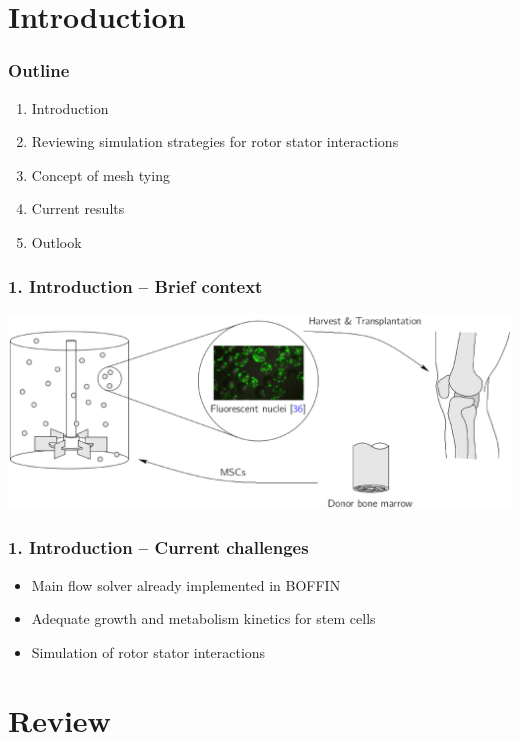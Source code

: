 \documentclass[10pt,xcolor=dvipsnames]{beamer}
\begin{document}
\section{Introduction}
\begin{frame}[t]

  \frametitle{Outline}
  \begin{enumerate}
   \item Introduction
   \item Reviewing simulation strategies for rotor stator interactions
   \item Concept of mesh tying
   \item Current results
   \item Outlook
  \end{enumerate}


\end{frame}

\begin{frame}[t]

  \frametitle{1. Introduction -- Brief context}
  \vfill
    \includegraphics[width=\columnwidth]{fig/overview.eps}
  \vfill
\end{frame}

\begin{frame}[t]
\frametitle{1. Introduction -- Current challenges}
  \begin{itemize}
    \item Main flow solver already implemented in BOFFIN
    \item Adequate growth and metabolism kinetics for stem cells
    \item Simulation of rotor stator interactions
  \end{itemize}

\end{frame}

\section{Review}
\end{document}

